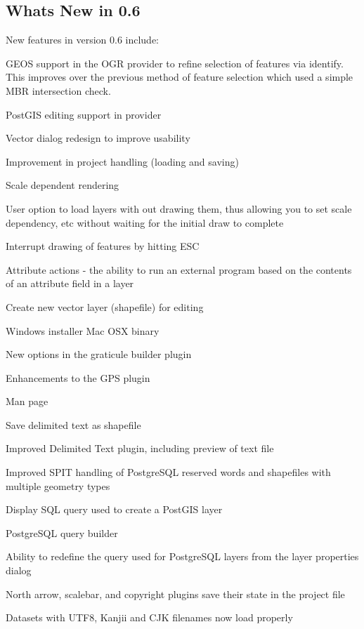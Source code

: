 \documentclass[10pt,english]{article}
\begin{document}
\begin{onehalfspace}
\section{Whats New in 0.6}
New features in version 0.6 include:
\begin{compactenum}
\item GEOS support in the OGR provider to refine selection of features via identify. This improves over the previous method of feature selection which used a simple MBR intersection check.
\item PostGIS editing support in provider
\item Vector dialog redesign to improve usability
\item Improvement in project handling (loading and saving)
\item Scale dependent rendering
\item User option to load layers with out drawing them, thus allowing you to set scale dependency, etc without waiting for the initial draw to complete
\item Interrupt drawing of features by hitting ESC
\item Attribute actions - the ability to run an external program based on the contents of an attribute field in a layer
\item Create new vector layer (shapefile) for editing
\item Windows installer
 Mac OSX binary
\item New options in the graticule builder plugin
\item Enhancements to the GPS plugin
\item Man page
\item Save delimited text as shapefile
\item Improved Delimited Text plugin, including preview of text file
\item Improved SPIT handling of PostgreSQL reserved words and shapefiles with multiple geometry types
\item Display SQL query used to create a PostGIS layer
\item PostgreSQL query builder
\item Ability to redefine the query used for PostgreSQL layers from the layer properties dialog
\item North arrow, scalebar, and copyright plugins save their state in the project file
\item Datasets with UTF8, Kanjii and CJK filenames now load properly


\end{compactenum}
\end{onehalfspace}
\end{document}
